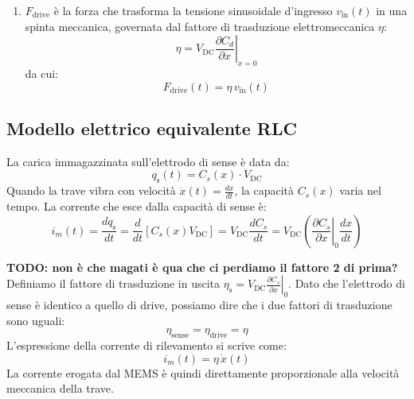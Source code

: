 \documentclass[11pt,a4paper]{article}
\begin{document}
\begin{enumerate}
\begin{equation}
    \end{equation}
    \item $F_{\text{drive}}$ è la forza che trasforma la tensione sinusoidale d'ingresso $v_{\text{in}}(t)$ in una spinta meccanica, governata dal fattore di trasduzione elettromeccanica $\eta$:
    \begin{equation}
        \label{eq:eta_def}
        \eta = V_{\text{DC}} \left. \frac{\partial C_d}{\partial x} \right|_{x=0}
    \end{equation}
    da cui:
    \begin{equation}
        F_{\text{drive}}(t) = \eta \, v_{\text{in}}(t)
    \end{equation}
\end{enumerate}

\newpage

\subsection{Modello elettrico equivalente RLC}
\label{sec:modello_rlc}

La carica immagazzinata sull'elettrodo di sense è data da:
\begin{equation}
    q_{\text{s}}(t) = C_s(x) \cdot V_{\text{DC}}
\end{equation}
Quando la trave vibra con velocità $\dot{x}(t) = \frac{dx}{dt}$, la capacità $C_s(x)$ varia nel tempo. La corrente che esce dalla capacità di sense è:
\begin{equation}
    i_m(t) = \frac{d q_{\text{s}}}{dt} = \frac{d}{dt} \left[ C_s(x) V_{\text{DC}} \right] = V_{\text{DC}} \frac{d C_s}{dt} = V_{\text{DC}} \left( \left. \frac{\partial C_s}{\partial x} \right|_0 \frac{dx}{dt} \right)
\end{equation}

\textbf{TODO: non è che magati è qua che ci perdiamo il fattore 2 di prima?}\\
Definiamo il fattore di trasduzione in uscita $\eta_{\text{s}} = V_{\text{DC}} \left. \frac{\partial C_s}{\partial x} \right|_0$. Dato che l'elettrodo di sense è identico a quello di drive, possiamo dire che i due fattori di trasduzione sono uguali:
\begin{equation}
    \eta_{\text{sense}} = \eta_{\text{drive}} = \eta
\end{equation}
L'espressione della corrente di rilevamento si scrive come:
\begin{equation}
    \label{eq:is_vs_xdot}
    i_m(t) = \eta \, \dot{x}(t)
\end{equation}
La corrente erogata dal MEMS è quindi direttamente proporzionale alla velocità meccanica della trave.
\vspace{0.3cm}
\end{document}
